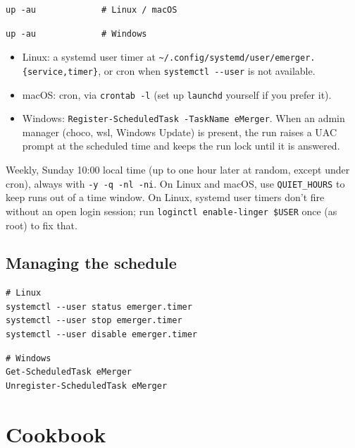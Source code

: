 \documentclass[11pt,a4paper]{article}
\begin{document}
\begin{lstlisting}[language=bashplus]
up -au             # Linux / macOS
\end{lstlisting}
\begin{lstlisting}[language=psplus]
up -au             # Windows
\end{lstlisting}

\begin{itemize}
  \item Linux: a systemd user timer at
        \verb|~/.config/systemd/user/emerger.{service,timer}|, or cron
        when \texttt{systemctl -{}-user} is not available.
  \item macOS: cron, via \texttt{crontab -l} (set up \texttt{launchd}
        yourself if you prefer it).
  \item Windows: \texttt{Register-ScheduledTask -TaskName eMerger}. When
        an admin manager (choco, wsl, Windows Update) is present, the run
        raises a UAC prompt at the scheduled time and keeps the run lock
        until it is answered.
\end{itemize}

Weekly, Sunday 10:00 local time (up to one hour later at random, except
under cron), always with
\texttt{-y -q -nl -ni}. On Linux and macOS, use \texttt{QUIET\_HOURS} to
keep runs out of a time window. On Linux, systemd user timers don't fire without an open
login session; run \texttt{loginctl enable-linger \$USER} once (as root)
to fix that.

\subsection{Managing the schedule}

\begin{lstlisting}[language=bashplus]
# Linux
systemctl --user status emerger.timer
systemctl --user stop emerger.timer
systemctl --user disable emerger.timer
\end{lstlisting}

\begin{lstlisting}[language=psplus]
# Windows
Get-ScheduledTask eMerger
Unregister-ScheduledTask eMerger
\end{lstlisting}

\section{Cookbook}\label{sec:cookbook}
\end{document}
